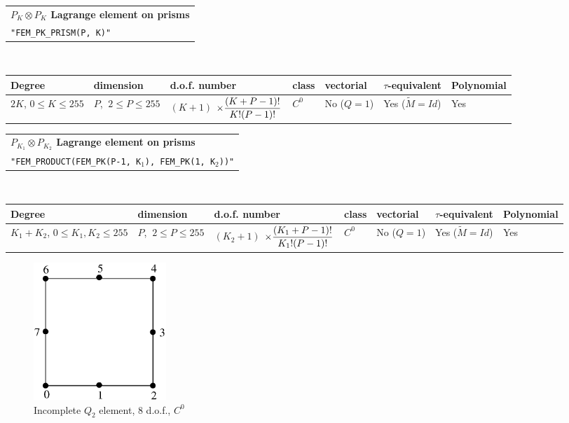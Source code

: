 \documentclass[10pt,a4paper]{article}
\begin{document}
\begin{center}
\begin{tabular}{|m{16.109cm}|} \hline 
{\bf $P_K \otimes P_K$ Lagrange element on prisms}\\
{\tt "FEM\_PK\_PRISM(P, K)"} 
\end{tabular} \\ \vspace{-1pt} 
\begin{tabular}{|m{2cm}|m{2cm}|m{2.5cm}|m{1.5cm}|m{1.5cm}|m{2cm}|m{2cm}|} \hline 
Degree & dimension & d.o.f. number & class & vectorial & \mbox{$\tau$-equivalent} & Polynomial\\ \hline
\small $2K$, \mbox{$0 \leq K \leq 255$} & \small $P$, \mbox{$\ 2 \leq P \leq 255$} & \mbox{$(K+1)$} \mbox{$\times {\displaystyle\frac{\displaystyle(K+P-1)!}{\displaystyle K! (P-1)!}}$} & $C^0$ & No \mbox{($Q = 1$)} & Yes \mbox{($\tilde{M} = Id$)}  & Yes\\ \hline
\end{tabular}
\end{center}

\begin{center}
\begin{tabular}{|m{16.109cm}|} \hline 
{\bf $P_{K_1} \otimes P_{K_2}$ Lagrange element on prisms}\\
{\tt "FEM\_PRODUCT(FEM\_PK(P-1, K$_1$), FEM\_PK(1, K$_2$))"} 
\end{tabular} \\ \vspace{-1pt} 
\begin{tabular}{|m{2cm}|m{2cm}|m{2.5cm}|m{1.5cm}|m{1.5cm}|m{2cm}|m{2cm}|} \hline 
Degree & dimension & d.o.f. number & class & vectorial & \mbox{$\tau$-equivalent} & Polynomial\\ \hline
\small \mbox{$K_1+K_2$}, \tiny \mbox{$0 \leq K_1,K_2 \leq 255$} & \small $P$, \mbox{$\ 2 \leq P \leq 255$} & \mbox{$(K_2+1)$} \mbox{$\times {\displaystyle\frac{\displaystyle(K_1+P-1)!}{\displaystyle K_1! (P-1)!}}$} & $C^0$ & No \mbox{($Q = 1$)} & Yes \mbox{($\tilde{M} = Id$)}  & Yes\\ \hline
\end{tabular}
\end{center}

\begin{figure}[H]
  \begin{center}
    \includegraphics[width=5cm,angle=0]{getfemlist_quad8.eps} \\
    Incomplete $Q_2$ element, 8 d.o.f., $C^0$  \\
  \end{center}
\end{figure}
\end{document}
